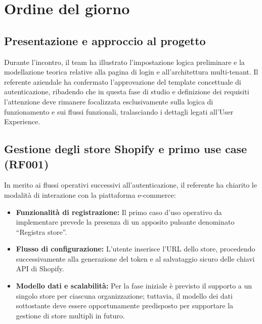 \newpage
\vspace{0.8cm}

\section{Ordine del giorno}

\subsection{Presentazione e approccio al progetto}
Durante l'incontro, il team ha illustrato l'impostazione logica preliminare e la modellazione teorica relative alla pagina di login e all'architettura multi-tenant. Il referente aziendale ha confermato l'approvazione del template concettuale di autenticazione, ribadendo che in questa fase di studio e definizione dei requisiti l'attenzione deve rimanere focalizzata esclusivamente sulla logica di funzionamento e sui flussi funzionali, tralasciando i dettagli legati all'User Experience.
\subsection{Gestione degli store Shopify e primo use case (RF001)}
In merito ai flussi operativi successivi all'autenticazione, il referente ha chiarito le modalità di interazione con la piattaforma e-commerce:
\begin{itemize}
    \item \textbf{Funzionalità di registrazione:} Il primo caso d'uso operativo da implementare prevede la presenza di un apposito pulsante denominato ``Registra store''.
    \item \textbf{Flusso di configurazione:} L'utente inserisce l'URL dello store, procedendo successivamente alla generazione del token e al salvataggio sicuro delle chiavi API di Shopify.
    \item \textbf{Modello dati e scalabilità:} Per la fase iniziale è previsto il supporto a un singolo store per ciascuna organizzazione; tuttavia, il modello dei dati sottostante deve essere opportunamente predisposto per supportare la gestione di store multipli in futuro.
\end{itemize}
